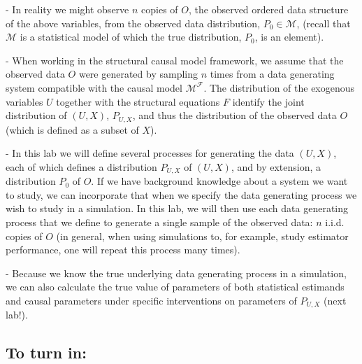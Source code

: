 \documentclass[answers]{exam}
\newenvironment{packed_item}{
\begin{itemize}
 \setlength{\itemsep}{0pt}
  \setlength{\parskip}{0pt}
  \setlength{\parsep}{0pt}
}{\end{itemize}}
\begin{document}
\begin{packed_item}
\item[-] In reality we might observe $n$ copies of $O$, the observed ordered data structure of the above variables, from the observed data distribution, $P_{0}\in \mathcal{M}$, (recall that $\mathcal{M}$ is a statistical model of which the true distribution, $P_{0}$, is an element). 
\item[-] When working in the structural causal model framework, we assume that the observed data $O$ were generated by sampling $n$ times from a data generating system compatible with the causal model $\mathcal{M^F}$. The distribution of the exogenous variables $U$ together with the structural equations $F$ identify the joint distribution of $(U,X)$, $P_{U,X}$, and thus the distribution of the observed data $O$ (which is defined as a subset of $X$). 
\item[-] In this lab we will define several processes for generating the data $(U,X)$, each of which defines a distribution $P_{U,X}$ of $(U,X)$, and by extension, a distribution $P_0$ of $O$. If we have background knowledge about a system we want to study, we can incorporate that when we specify the data generating process we wish to study in a simulation. In this lab, we will then use each data generating process that we define to generate a single sample of the observed data: $n$ i.i.d. copies of $O$ (in general, when using simulations to, for example, study estimator performance, one will repeat this process many times). 
\item[-] Because we know the true underlying data generating process in a simulation, we can also calculate the true value of parameters of both statistical estimands and causal parameters under specific interventions on parameters of $P_{U,X}$ (next lab!).
\end{packed_item}

\subsection{To turn in:}
\end{document}
